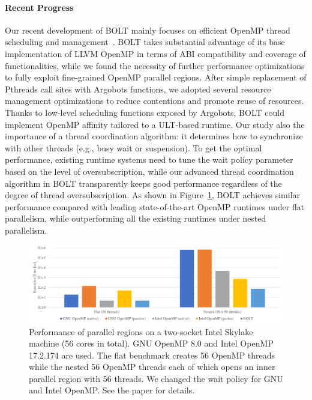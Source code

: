 \paragraph{Recent Progress}

Our recent development of BOLT mainly focuses on efficient OpenMP
thread scheduling and management~\cite{BOLT}. BOLT takes substantial
advantage of its base implementation of LLVM OpenMP in terms of ABI
compatibility and coverage of functionalities, while we found the
necessity of further performance optimizations to fully exploit
fine-grained OpenMP parallel regions. After simple replacement of
Pthreads call sites with Argobots functions, we adopted several
resource management optimizations to reduce contentions and promote
reuse of resources. Thanks to low-level scheduling functions exposed
by Argobots, BOLT could implement OpenMP affinity tailored to a
ULT-based runtime. Our study also  the importance of a thread
coordination algorithm: it determines how to synchronize with other
threads (e.g., busy wait or suspension). To get the optimal
performance, existing runtime systems need to tune the wait policy
parameter based on the level of oversubscription, while our advanced
thread coordination algorithm in BOLT transparently keeps good
performance regardless of the degree of thread oversubscription. As
shown in Figure~\ref{fig:sollve-bolt}, BOLT achieves similar
performance compared with leading state-of-the-art OpenMP runtimes
under flat parallelism, while outperforming all the existing runtimes
under nested parallelism.

\begin{figure}[t]
  \centering
  \includegraphics[width=0.9\columnwidth]{projects/2.3.2-Tools/2.3.2.11-SOLLVE/SOLLVE-BOLT.pdf}

  \caption{\label{fig:sollve-bolt}Performance of parallel regions on a
two-socket Intel Skylake machine (56 cores in total). GNU OpenMP 8.0
and Intel OpenMP 17.2.174 are used. The flat benchmark creates 56
OpenMP threads while the nested 56 OpenMP threads each of which opens
an inner parallel region with 56 threads. We changed the wait policy
for GNU and Intel OpenMP. See the paper \cite{BOLT} for details.}

\end{figure}

